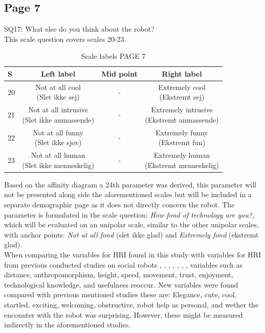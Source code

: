 \subsection{Page 7}
\noindent
SQ17: What else do you think about the robot?\\%
This scale question covers scales 20-23. 
%
\begin{table}[H]
	\centering
\caption{Scale labels PAGE 7}
	\label{tab:ScalesPage7} 
	\begin{tabular}{l|c|c|c}
		S    & Left label & Mid point & Right label \\\hline
		20   & \makecell{Not at all cool\\(Slet ikke sej)}  & - & \makecell{Extremely cool \\(Ekstremt sej)}        \\\hline
		21   & \makecell{Not at all intrusive \\(Slet ikke anmassende)} & - & \makecell{Extremely intrusive \\(Ekstremt anmassende)}         \\\hline
		22   & \makecell{Not at all funny\\(Slet ikke sjov)} & - & \makecell{Extremely funny \\(Ekstremt fun)}         \\\hline
	 	23   & \makecell{Not at all human \\(Slet ikke menneskelig)} & - & \makecell{Extremely human \\(Ekstremt menneskelig)}               
	\end{tabular}        
\end{table}
\noindent
%
Based on the affinity diagram a 24th parameter was derived, this parameter will not be presented along side the aforementioned scales but will be included in a separate demographic page as it does not directly concern the robot. The parameter is formulated in the scale question: \textit{How fond of technology are you?}, which will be evaluated on an unipolar scale, similar to the other unipolar scales, with anchor points: \textit{Not at all fond} (slet ikke glad) and \textit{Extremely fond} (ekstremt glad).\\  

\noindent
When comparing the variables for HRI found in this study with variables for HRI from previous conducted studies on social robots \cite{PDF:ExploringInfluencingVariable}, \cite{PDF:SharingALifeHarvey}, \cite{PDF:InTheCompanyofRobots}, \cite{PDF:CloseButNotStuck}, \cite{PDF:TheImpactOfTraveler}, \cite{PDF:HumanRobotEmodiedInteraction}, \cite{PDF:RecommendationEffects}, variables such as distance, anthropomorphism, height, speed, movement, trust, enjoyment, technological knowledge, and usefulness reoccur. New variables were found compared with previous mentioned studies these are: Elegance, cute, cool, startled, exciting, welcoming, obstructive, robot help as personal, and wether the encounter with the robot was surprising. However, these might be measured indirectly in the aforementioned studies.

